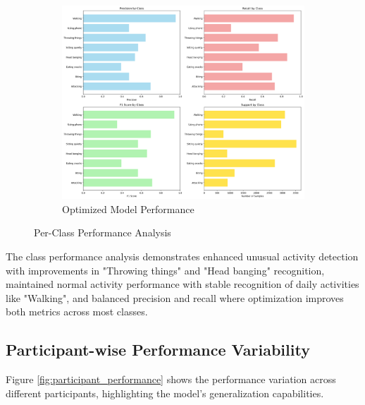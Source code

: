 \documentclass{iopconfser}
\begin{document}
\begin{figure}[H]
\begin{subfigure}{0.48\textwidth}
    \includegraphics[width=\textwidth]{results/metrics/optimized/class_performance.png}
    \caption{Optimized Model Performance}
    \label{fig:optimized_class}
\end{subfigure}
\caption{Per-Class Performance Analysis}
\label{fig:class_performance}
\end{figure}

The class performance analysis demonstrates enhanced unusual activity detection with improvements in "Throwing things" and "Head banging" recognition, maintained normal activity performance with stable recognition of daily activities like "Walking", and balanced precision and recall where optimization improves both metrics across most classes.

\subsection{Participant-wise Performance Variability}

Figure \ref{fig:participant_performance} shows the performance variation across different participants, highlighting the model's generalization capabilities.
\end{document}
